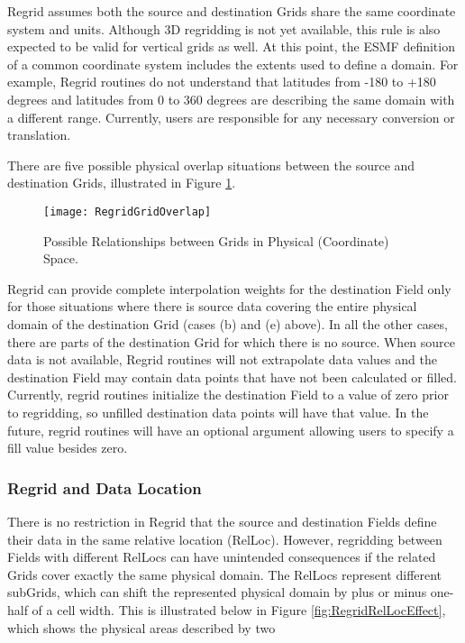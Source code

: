 Regrid assumes both the source and destination Grids share the same coordinate
system and units.  Although 3D regridding is not yet available, this rule is
also expected to be valid for vertical grids as well.  At this point, the ESMF
definition of a common coordinate system includes the extents used to define
a domain.  For example, Regrid routines do not understand that latitudes from
-180 to +180 degrees and latitudes from 0 to 360 degrees are describing the
same domain with a different range.  Currently, users are responsible for any
necessary conversion or translation.  

There are five possible physical overlap situations between the source and
destination Grids, illustrated in Figure \ref{fig:RegridGridOverlap}.

\begin{center}
\begin{figure}
\caption{Possible Relationships between Grids in Physical (Coordinate) Space. }
\label{fig:RegridGridOverlap}
\resizebox{\textwidth}{!}
  {\texttt{[image: RegridGridOverlap]}}
\end{figure}
\end{center}

Regrid can provide complete interpolation weights for the destination Field
only for those situations where there is source data covering the entire physical
domain of the destination Grid (cases (b) and (e) above).  In all the other
cases, there are parts of the destination Grid for which there is no source. 
When source data is not available, Regrid routines will not extrapolate data
values and the destination Field may contain data points that have not been
calculated or filled.  Currently, regrid routines initialize the destination
Field to a value of zero prior to regridding, so unfilled destination data points
will have that value.  In the future, regrid routines will have an optional
argument allowing users to specify a fill value besides zero.  


\subsubsection{Regrid and Data Location}

There is no restriction in Regrid that the source and destination Fields
define their data in the same relative location (RelLoc).  However, regridding
between Fields with different RelLocs can have unintended consequences if the
related Grids cover exactly the same physical domain.  The RelLocs represent
different subGrids, which can shift the represented physical domain by plus or
minus one-half of a cell width.  This is illustrated below in Figure 
\ref{fig:RegridRelLocEffect}, which shows the physical areas described by two

